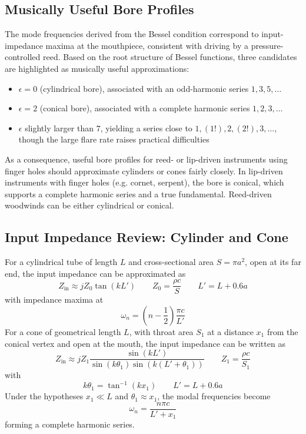 \subsection{Musically Useful Bore Profiles}

The mode frequencies derived from the Bessel condition correspond to input-impedance maxima at the mouthpiece, consistent with driving by a pressure-controlled reed. Based on the root structure of Bessel functions, three candidates are highlighted as musically useful approximations:

\begin{itemize}
    \item \( \epsilon = 0 \) (cylindrical bore), associated with an odd-harmonic series \( 1,3,5,\ldots \)
    \item \( \epsilon = 2 \) (conical bore), associated with a complete harmonic series \( 1,2,3,\ldots \)
    \item \( \epsilon \) slightly larger than \( 7 \), yielding a series close to \( 1,(1!),2,(2!),3,\ldots \), though the large flare rate raises practical difficulties
\end{itemize}

As a consequence, useful bore profiles for reed- or lip-driven instruments using finger holes should approximate cylinders or cones fairly closely. In lip-driven instruments with finger holes (e.g. cornet, serpent), the bore is conical, which supports a complete harmonic series and a true fundamental. Reed-driven woodwinds can be either cylindrical or conical.

\subsection{Input Impedance Review: Cylinder and Cone}

For a cylindrical tube of length \( L \) and cross-sectional area \( S = \pi a^2 \), open at its far end, the input impedance can be approximated as
\[
Z_{\mathrm{in}} \approx jZ_{0}\tan(kL')
\qquad
Z_{0} = \frac{\rho c}{S}
\qquad
L' = L + 0.6a
\]
with impedance maxima at
\[
\omega_n = \left(n - \frac{1}{2}\right)\frac{\pi c}{L'}
\]
For a cone of geometrical length \( L \), with throat area \( S_1 \) at a distance \( x_1 \) from the conical vertex and open at the mouth, the input impedance can be written as
\[
Z_{\mathrm{in}} \approx
jZ_{1}\frac{\sin(kL')}{\sin(k\theta_{1})\sin(k(L' + \theta_{1}))}
\qquad
Z_{1} = \frac{\rho c}{S_{1}}
\]
with
\[
k\theta_{1} = \tan^{-1}(kx_{1})
\qquad
L' = L + 0.6a
\]
Under the hypotheses \( x_{1} \ll L \) and \( \theta_{1} \approx x_{1} \), the modal frequencies become
\[
\omega_n = \frac{n\pi c}{L' + x_{1}}
\]
forming a complete harmonic series. 

